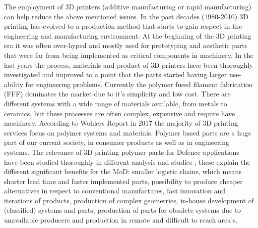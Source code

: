 The employment of 3D printers (additive manufacturing or rapid manufacturing) can help reduce the above mentioned issues. In the past decades (1980-2010) 3D printing has evolved to a production method that starts to gain respect in the engineering and manufacturing environment. At the beginning of the 3D printing era it was often over-hyped and mostly used for prototyping and aesthetic parts that were far from being implemented as critical components in machinery. In the last years the process, materials and product of 3D printers have been thoroughly investigated and improved to a point that the parts started having larger use-ability for engineering problems. Currently the polymer fused filament fabrication (FFF) dominates the market due to it's simplicity and low cost. There are different systems with a wide range of materials available, from metals to ceramics, but these processes are often complex, expensive and require have machinery. According to Wohlers Report in 2017 \cite{WohlersAssociatesWohlersAssociates} the majority of 3D printing services focus on polymer systems and materials. Polymer based parts are a huge part of our current society, in consumer products as well as in engineering systems. The relevance of 3D printing polymer parts for Defence applications have been studied thoroughly in different analysis and studies \cite{Bastiaans2015DeDefensie} \cite{NATOPerspectivesOperations} \cite{Joyce20143DDefense}, these explain the different significant benefits for the MoD: smaller logistic chains, which means shorter lead time and faster implemented parts, possibility to produce cheaper alternatives in respect to conventional manufactures, fast innovation and iterations of products, production of complex geometries, in-house development of (classified) systems and parts, production of parts for obsolete systems due to unavailable producers and production in remote and difficult to reach area's. 

